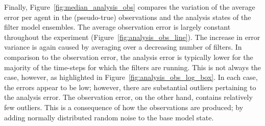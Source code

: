 \documentclass{article}
\begin{document}
Finally, Figure~\ref{fig:median_analysis_obs} compares the variation of the average error per agent in the (pseudo-true) observations and the analysis states of the filter model ensembles. 
The average observation error is largely constant throughout the experiment (Figure~\ref{fig:analysis_obs_line}). The increase in error variance is again caused by averaging over a decreasing number of filters. In comparison to the observation error, the analysis error is typically lower
for the majority of the time-steps for which the filters are running. This is not always the case, however, as highlighted in Figure~\ref{fig:analysis_obs_log_box}. In each case, the errors appear to be low; however, there are substantial outliers pertaining to the analysis error. The observation error, on the other hand, contains relatively few outliers. This is a consequence of how the observations are produced; by adding normally distributed random noise to the base model state.
\end{document}
